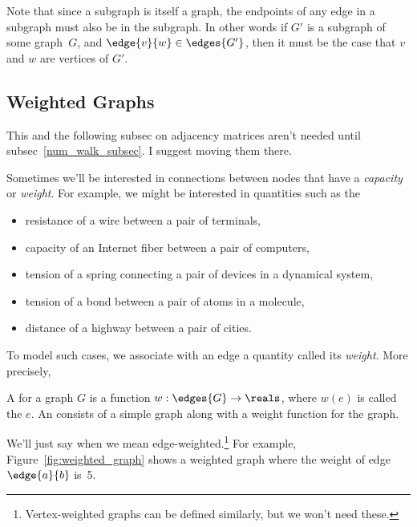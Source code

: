 \begin{editingnotes}
Note that since a subgraph is itself a graph, the endpoints of any
edge in a subgraph must also be in the subgraph.  In other words if
$G'$ is a subgraph of some graph~$G$, and $\edge{v}{w} \in
\edges{G'}$, then it must be the case that $v$ and $w$ are vertices of
$G'$.
\end{editingnotes}

\subsection{Weighted Graphs}
\begin{editingnotes}
This and the following subsec on adjacency matrices aren't needed until
subsec~\ref{num_walk_subsec}.  I suggest moving them there.
\end{editingnotes}

 Sometimes we'll be interested in
connections between nodes that have a \emph{capacity} or \emph{weight}.
For example, we might be interested in quantities such as the
\begin{itemize}

\item resistance of a wire between a pair of terminals, 

\item capacity of an Internet fiber between a pair of computers,

\item tension of a spring connecting a pair of devices in a dynamical system,

\item tension of a bond between a pair of atoms in a molecule,

\item distance of a highway between a pair of cities.

\end{itemize}
To model such cases, we associate with an edge a quantity called its
\emph{weight}.  More precisely,
\begin{definition}
  A  for a graph $G$ is a function $w: \edges{G} \to
  \reals$, where $w(e)$ is called the  $e$.
An  consists of a simple graph along with
a weight function for the graph.
\end{definition}
We'll just say  when we mean
edge-weighted.\footnote{Vertex-weighted graphs can be defined similarly,
  but we won't need these.}
For example, Figure~\ref{fig:weighted_graph} shows a weighted graph
where the weight of edge $\edge{a}{b}$ is~5.

